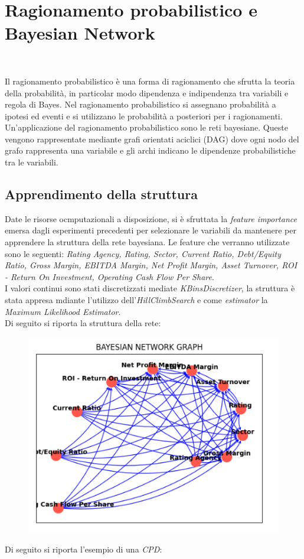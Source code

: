 \section{Ragionamento probabilistico e Bayesian Network}\

\noindent Il ragionamento probabilistico è una forma di ragionamento che sfrutta la teoria della
probabilità, in particolar modo dipendenza e indipendenza tra variabili e regola di
Bayes. Nel ragionamento probabilistico si assegnano probabilità a ipotesi ed eventi e
si utilizzano le probabilità a posteriori per i ragionamenti. Un’applicazione del
ragionamento probabilistico sono le reti bayesiane. Queste vengono rappresentate
mediante grafi orientati aciclici (DAG) dove ogni nodo del grafo rappresenta una
variabile e gli archi indicano le dipendenze probabilistiche tra le variabili.

\subsection{Apprendimento della struttura}
\noindent Date le risorse ocmputazionali a disposizione, si è sfruttata la \textit{feature importance} emersa dagli esperimenti precedenti per selezionare le variabili da mantenere per apprendere la struttura della rete bayesiana.
Le feature che verranno utilizzate sono le seguenti: \textit{Rating Agency, Rating, Sector, Current Ratio, Debt/Equity Ratio, Gross Margin, EBITDA Margin, Net Profit Margin, Asset Turnover, ROI - Return On Investment, Operating Cash Flow Per Share}.
\\ I valori continui sono stati discretizzati mediate \textit{KBinsDiscretizer}, la struttura è stata appresa mdiante l'utilizzo dell'\textit{HillClimbSearch} e come \textit{estimator} la \textit{Maximum Likelihood Estimator}. 
\\ Di seguito si riporta la struttura della rete:
\begin{figure}[H]
    \centering
    \includegraphics[scale=0.8]{img/bn.png}
\end{figure}
\noindent Di seguito si riporta l'esempio di una \textit{CPD}:

